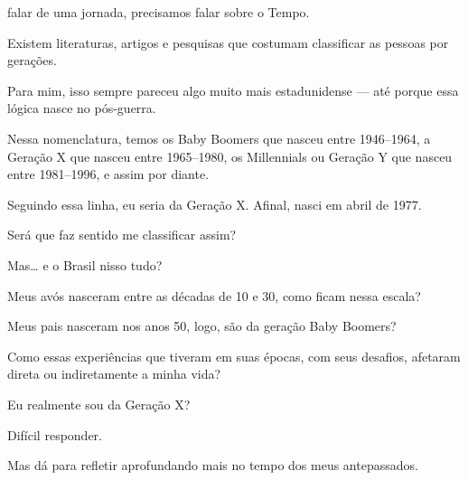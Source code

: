 


 falar de uma jornada, precisamos falar sobre o Tempo.

Existem literaturas, artigos e pesquisas que costumam classificar as pessoas por gerações.

Para mim, isso sempre pareceu algo muito mais estadunidense — até porque essa lógica nasce no pós-guerra. 

Nessa nomenclatura, temos os Baby Boomers que nasceu entre 1946–1964, a Geração X que nasceu entre 1965–1980, os Millennials ou Geração Y que nasceu entre 1981–1996, e assim por diante.

Seguindo essa linha, eu seria da Geração X. Afinal, nasci em abril de 1977.

Será que faz sentido me classificar assim?

Mas… e o Brasil nisso tudo?

Meus avós nasceram entre as décadas de 10 e 30, como ficam nessa escala?

Meus pais nasceram nos anos 50, logo, são da geração Baby Boomers?

Como essas experiências que tiveram em suas épocas, com seus desafios, afetaram direta ou indiretamente a minha vida?

Eu realmente sou da Geração X?

Difícil responder.

Mas dá para refletir aprofundando mais no tempo dos meus antepassados.

